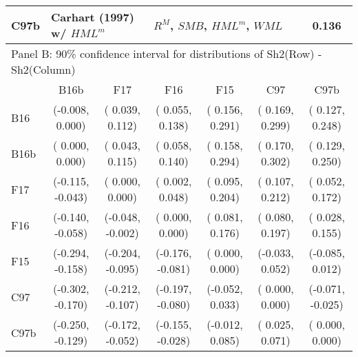 \begin{table}[!ht]
\begin{tabular}{lcccccc}
  C97b  & \multicolumn{2}{l}{Carhart (1997) w/ $HML^m$}    & \multicolumn{3}{l}{$R^M$, $SMB$, $HML^m$, $WML$}               & 0.136 \\
  \midrule
  \multicolumn{7}{l}{Panel B: 90\% confidence interval for distributions of Sh2(Row) - Sh2(Column)} \\
        &        B16b      &        F17       &        F16       &        F15       &        C97       &        C97b      \\
  B16   & (-0.008,  0.000) & ( 0.039,  0.112) & ( 0.055,  0.138) & ( 0.156,  0.291) & ( 0.169,  0.299) & ( 0.127,  0.248) \\
  B16b  & ( 0.000,  0.000) & ( 0.043,  0.115) & ( 0.058,  0.140) & ( 0.158,  0.294) & ( 0.170,  0.302) & ( 0.129,  0.250) \\
  F17   & (-0.115, -0.043) & ( 0.000,  0.000) & ( 0.002,  0.048) & ( 0.095,  0.204) & ( 0.107,  0.212) & ( 0.052,  0.172) \\
  F16   & (-0.140, -0.058) & (-0.048, -0.002) & ( 0.000,  0.000) & ( 0.081,  0.176) & ( 0.080,  0.197) & ( 0.028,  0.155) \\
  F15   & (-0.294, -0.158) & (-0.204, -0.095) & (-0.176, -0.081) & ( 0.000,  0.000) & (-0.033,  0.052) & (-0.085,  0.012) \\
  C97   & (-0.302, -0.170) & (-0.212, -0.107) & (-0.197, -0.080) & (-0.052,  0.033) & ( 0.000,  0.000) & (-0.071, -0.025) \\
  C97b  & (-0.250, -0.129) & (-0.172, -0.052) & (-0.155, -0.028) & (-0.012,  0.085) & ( 0.025,  0.071) & ( 0.000,  0.000) \\
  \bottomrule
\end{tabular}
\label{tbl:bootstrap}
\end{table}
